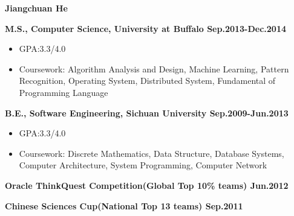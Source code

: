\documentclass{myres}
\begin{document}
{\LARGE \bf Jiangchuan He}
\myline

{

}

{\textbf{M.S., Computer Science, University at Buffalo \hfill Sep.2013-Dec.2014} 		
\begin{itemize}[topsep=0pt, leftmargin=0.2in] \itemsep -5pt
	\item[]GPA:3.3/4.0
	\item[]Coursework: Algorithm Analysis and Design, Machine Learning, Pattern Recognition, Operating System, Distributed System,
		Fundamental of Programming Language
\end{itemize}
\par
\smallskip
\textbf{B.E., Software Engineering, Sichuan University \hfill Sep.2009-Jun.2013} 		
\begin{itemize}[topsep=0pt, leftmargin=0.2in] \itemsep -5pt
	\item[]GPA:3.3/4.0
	\item[]Coursework: Discrete Mathematics, Data Structure, Database Systems, Computer Architecture, System Programming,
		Computer Network
\end{itemize}

}
{
	\textbf{Oracle ThinkQuest Competition(Global Top 10\% teams) \hfill  Jun.2012}
	\par
 	\textbf{Chinese Sciences Cup(National Top 13 teams) \hfill Sep.2011}
}
\end{document}
